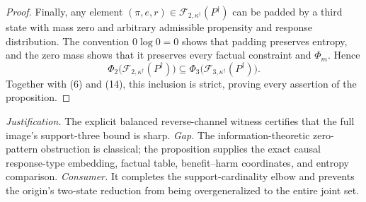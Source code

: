 \documentclass{article}
\begin{document}
\begin{proof}
Finally, any element \((\pi,e,r)\in\mathcal F_{2,\kappa^\dagger}(P^\dagger)\) can be padded by a third state with mass zero and arbitrary admissible propensity and response distribution.  The convention \(0\log0=0\) shows that padding preserves entropy, and the zero mass shows that it preserves every factual constraint and \(\Phi_m\).  Hence
\[
\Phi_2\bigl(\mathcal F_{2,\kappa^\dagger}(P^\dagger)\bigr)
\subseteq
\Phi_3\bigl(\mathcal F_{3,\kappa^\dagger}(P^\dagger)\bigr).
\]
Together with (6) and (14), this inclusion is strict, proving every assertion of the proposition.
\end{proof}
\par\smallskip\noindent \textit{Justification.} The explicit balanced reverse-channel witness certifies that the full image's support-three bound is sharp. \textit{Gap.} The information-theoretic zero-pattern obstruction is classical; the proposition supplies the exact causal response-type embedding, factual table, benefit--harm coordinates, and entropy comparison. \textit{Consumer.} It completes the support-cardinality elbow and prevents the origin's two-state reduction from being overgeneralized to the entire joint set.
\end{document}
